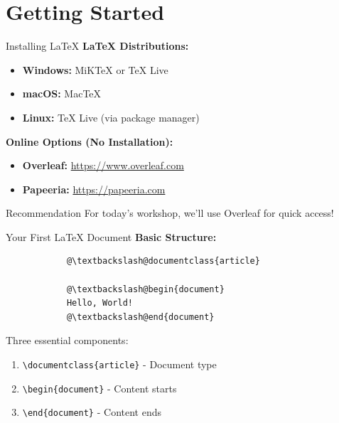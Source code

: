 \documentclass[aspectratio=169]{beamer}
\begin{document}
	\section{Getting Started}
	
	\begin{frame}{Installing LaTeX}
		\textbf{LaTeX Distributions:}
		\begin{itemize}
			\item \textbf{Windows:} MiKTeX or TeX Live
			\item \textbf{macOS:} MacTeX
			\item \textbf{Linux:} TeX Live (via package manager)
		\end{itemize}
		
		\vspace{1em}
		
		\textbf{Online Options (No Installation):}
		\begin{itemize}
			\item \textbf{Overleaf:} \url{https://www.overleaf.com}
			\item \textbf{Papeeria:} \url{https://papeeria.com}
		\end{itemize}
		
		\vspace{1em}
		
		\begin{alertblock}{Recommendation}
			For today's workshop, we'll use Overleaf for quick access!
		\end{alertblock}
	\end{frame}
	
	\begin{frame}[fragile]{Your First LaTeX Document}
		\textbf{Basic Structure:}
		
		\begin{lstlisting}
			@\textbackslash@documentclass{article}
			
			@\textbackslash@begin{document}
			Hello, World!
			@\textbackslash@end{document}
		\end{lstlisting}
		
		\vspace{1em}
		
		Three essential components:
		\begin{enumerate}
			\item \texttt{\textbackslash documentclass\{article\}} - Document type
			\item \texttt{\textbackslash begin\{document\}} - Content starts
			\item \texttt{\textbackslash end\{document\}} - Content ends
		\end{enumerate}
	\end{frame}
	
\end{document}
